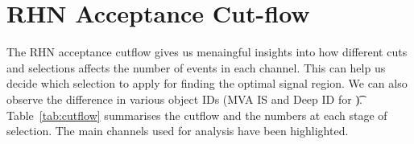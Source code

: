 \documentclass[letterpaper,12pt]{article}
\begin{document}
\begin{table}[h]
  \centering
  \large
  \setlength{\tabcolsep}{20pt}
  \renewcommand{\arraystretch}{1.5}
  \caption{Summary table for \3l{} channel.}
  \label{tab:3l}
\end{table}

\section{RHN Acceptance Cut-flow}
\label{sec:cutflow}

The RHN acceptance cutflow gives us menaingful insights into how different cuts and selections affects the number of events in each channel. This can help us decide which selection to apply for finding the optimal signal region. We can also observe the difference in various object IDs (MVA IS and Deep ID for \t). Table~\ref{tab:cutflow} summarises the cutflow and the numbers at each stage of selection. The main channels used for analysis have been highlighted.
\end{document}
